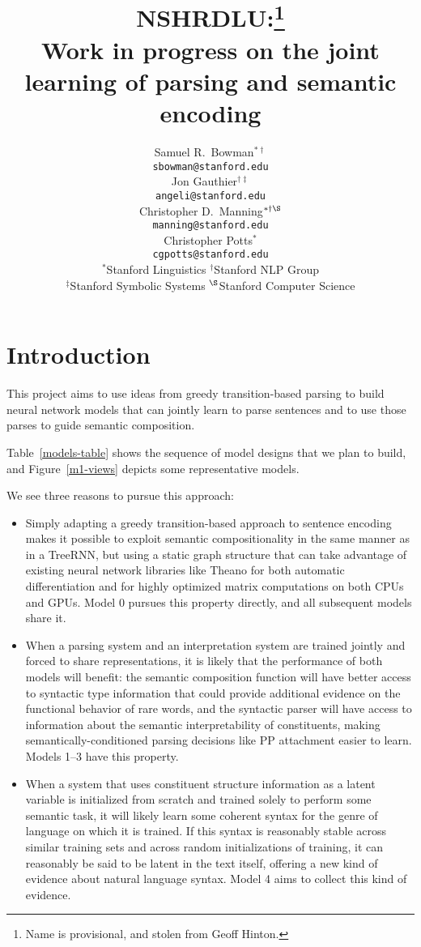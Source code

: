 \documentclass[11pt,letterpaper]{article}
\title{NSHRDLU:\thanks{Name is provisional, and stolen from Geoff Hinton.}\\Work in progress on the joint learning of parsing and semantic encoding}
\author{
Samuel R.\ Bowman$^{\ast\dag}$ \\
\texttt{sbowman@stanford.edu} \\
\And
Jon Gauthier$^{\dag\ddag}$ \\
\texttt{angeli@stanford.edu} \\
\AND
Christopher D.\ Manning$^{\ast\dag\S}$\\
\texttt{manning@stanford.edu}\\
\And
Christopher Potts$^{\ast}$\\
\texttt{cgpotts@stanford.edu}
\AND\\[-3ex]
{$^{\ast}$Stanford Linguistics\quad
$^{\dag}$Stanford NLP Group}\\
{$^{\ddag}$Stanford Symbolic Systems\quad
$^{\S}$Stanford Computer Science}
}
\date{}
\begin{document}
\maketitle

\section{Introduction}

This project aims to use ideas from greedy transition-based parsing to build neural network models that can jointly learn to parse sentences and to use those parses to guide semantic composition.

Table~\ref{models-table} shows the sequence of model designs that we plan to build, and Figure~\ref{m1-views} depicts some representative models.

We see three reasons to pursue this approach:
\begin{itemize}
\item Simply adapting a greedy transition-based approach to sentence encoding makes it possible to exploit semantic compositionality in the same manner as in a TreeRNN, but using a static graph structure that can take advantage of existing neural network libraries like Theano for both automatic differentiation and for highly optimized matrix computations on both CPUs and GPUs. Model 0 pursues this property directly, and all subsequent models share it.
\item When a parsing system and an interpretation system are trained jointly and forced to share representations, it is likely that the performance of both models will benefit: the semantic composition function will have better access to syntactic type information that could provide additional evidence on the functional behavior of rare words, and the syntactic parser will have access to information about the semantic interpretability of constituents, making semantically-conditioned parsing decisions like PP attachment easier to learn. Models 1--3 have this property.
\item When a system that uses constituent structure information as a latent variable is initialized from scratch and trained solely to perform some semantic task, it will likely learn some coherent syntax for the genre of language on which it is trained. If this syntax is reasonably stable across similar training sets and across random initializations of training, it can reasonably be said to be latent in the text itself, offering a new kind of evidence about natural language syntax. Model 4 aims to collect this kind of evidence.

\end{itemize}
\end{document}
